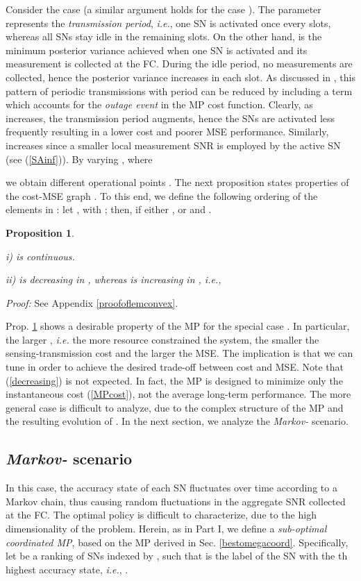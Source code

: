 \documentclass[10pt,twocolumn,twoside]{IEEEtran}
\newtheorem{propos}{Proposition}
\theoremstyle{plain}
\begin{document}
\noindent
{Consider the case  (a similar argument holds for the case ).
The parameter  represents the \emph{transmission period}, \emph{i.e.}, one SN is activated once every  slots, whereas all SNs stay idle in the 
remaining  slots.
On the other hand,  is the minimum posterior variance achieved when one SN is activated and its measurement is collected at the FC.
During the idle period, no measurements are collected, hence the posterior variance increases in each slot.
As discussed in \cite[Remark 5]{MichelusiP1}, this pattern of periodic transmissions with period  can be reduced
by including a term which accounts for the \emph{outage event}  in the MP cost function.
Clearly, as  increases, the transmission period  augments,
hence the SNs are activated less frequently resulting in a lower cost and poorer MSE performance.
Similarly,  increases since a smaller local measurement SNR is employed by the active SN (see (\ref{SAinf})).}
 By varying , 
where

we obtain different operational points .
The next proposition states properties of the cost-MSE graph .
To this end, we define the following ordering of the elements in : let 
,  with ;
then,  if either
, or  and
 .
\begin{propos}
\label{lemconvex}

\noindent \emph{i)}  is continuous.

\noindent \emph{ii)}    is decreasing in ,
 whereas   is increasing in ,
 \emph{i.e.},

\end{propos}
\noindent\emph{Proof:}
See Appendix \ref{proofoflemconvex}.
\hfill\QED

\noindent 
Prop. \ref{lemconvex} shows a desirable property of the MP for the special case .
In particular, the larger , \emph{i.e.} the more resource constrained the system, the smaller the sensing-transmission cost and the larger the
MSE. The implication is that we can tune  in order to achieve the desired trade-off between
cost and MSE. Note that 
 (\ref{decreasing}) is not expected. In fact, the MP is designed to minimize only the instantaneous cost (\ref{MPcost}),
not the average long-term performance. 
  The more general case  is difficult to analyze, due to the complex structure of the MP and the resulting evolution of .
  In the next section, we analyze the \emph{Markov-} scenario.
  \vspace{-3mm}
  \subsection{\emph{Markov-} scenario}
\noindent In this case, the accuracy state of each SN fluctuates over time according to a Markov chain, thus causing random fluctuations
in the aggregate SNR collected at the FC.
 The optimal policy is difficult to characterize,
 due to the high dimensionality of the problem.
 Herein, as in Part I, we define a \emph{sub-optimal coordinated MP}, based 
 on the MP derived in Sec. \ref{bestomegacoord}.
 Specifically, 
 let 
be a ranking of SNs indexed by , such that 
is the label of the SN with the th highest accuracy state,
\emph{i.e.}, .
 
\end{document}
